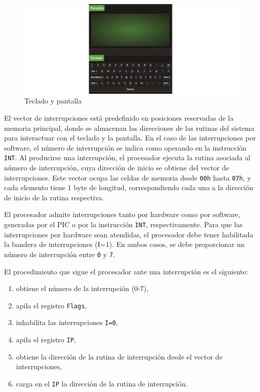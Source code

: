 \documentclass[12pt,oneside]{templates/unerthesis}
\providecommand{\tightlist}{%
  \setlength{\itemsep}{0pt}\setlength{\parskip}{0pt}}
\begin{document}
\begin{figure}

{\centering \includegraphics[width=1\linewidth]{images/tecladopantalla} 

}

\caption{Teclado y pantalla}\label{fig:tecladopantalla}
\end{figure}

El vector de interrupciones está predefinido en posiciones reservadas de la memoria principal, donde se almacenan las direcciones de las rutinas del sistema para interactuar con el teclado y la pantalla. En el caso de las interrupciones por software, el número de interrupción se indica como operando en la instrucción \texttt{INT}. Al producirse una interrupción, el procesador ejecuta la rutina asociada al número de interrupción, cuya dirección de inicio se obtiene del vector de interrupciones. Este vector ocupa las celdas de memoria desde \texttt{00h} hasta \texttt{07h}, y cada elemento tiene 1 byte de longitud, correspondiendo cada uno a la dirección de inicio de la rutina respectiva.

El procesador admite interrupciones tanto por hardware como por software, generadas por el PIC o por la instrucción \texttt{INT}, respectivamente. Para que las interrupciones por hardware sean atendidas, el procesador debe tener habilitada la bandera de interrupciones (I=1). En ambos casos, se debe proporcionar un número de interrupción entre \texttt{0} y \texttt{7}.

El procedimiento que sigue el procesador ante una interrupción es el siguiente:

\begin{enumerate}
\def\labelenumi{\arabic{enumi}.}
\tightlist
\item
  obtiene el número de la interrupción (0-7),
\item
  apila el registro \texttt{Flags},
\item
  inhabilita las interrupciones \texttt{I=0},
\item
  apila el registro \texttt{IP},
\item
  obtiene la dirección de la rutina de interrupción desde el vector de interrupciones,
\item
  carga en el \texttt{IP} la dirección de la rutina de interrupción.
\end{enumerate}
\end{document}
